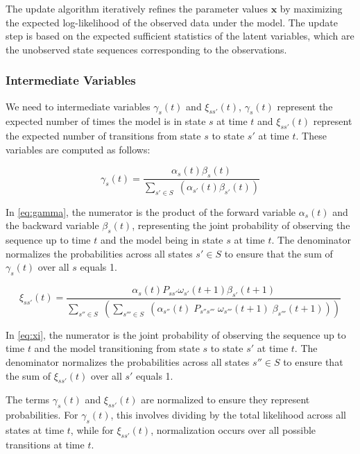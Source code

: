 The update algorithm iteratively refines the parameter values $\mathbf{x}$ by maximizing the expected log-likelihood of the observed data under the model.
The update step is based on the expected sufficient statistics of the latent variables, which are the unobserved state sequences corresponding to the observations.

\subsubsection{Intermediate Variables}
We need to intermediate variables $\gamma_s(t)$ and $\xi_{ss'}(t)$, $\gamma_s(t)$ represent the expected number of times the model is in state $s$ at time $t$ and $\xi_{ss'}(t)$ represent the expected number of transitions from state $s$ to state $s'$ at time $t$.
These variables are computed as follows:


\begin{equation}
    \gamma_s(t) = \frac{\alpha_s(t) \beta_s(t)}{\sum_{s' \in S} \;(\alpha_{s'}(t) \beta_{s'}(t))}
    \label{eq:gamma}
\end{equation}


In \autoref{eq:gamma}, the numerator is the product of the forward variable $\alpha_s(t)$ and the backward variable $\beta_s(t)$, representing the joint probability of observing the sequence up to time $t$ and the model being in state $s$ at time $t$.
The denominator normalizes the probabilities across all states $s' \in S$ to ensure that the sum of $\gamma_s(t)$ over all $s$ equals 1.


\begin{equation}
    \xi_{ss'}(t) = \frac{\alpha_s(t) P_{ss'} \omega_{s'}(t + 1) \beta_{s'}(t + 1)}{\sum_{s'' \in S} \;(\sum_{s''' \in S} \; (\alpha_{s''}(t) \; P_{s''s'''} \; \omega_{s'''}(t + 1) \; \beta_{s'''}(t + 1)))}
    \label{eq:xi}
\end{equation}


In \autoref{eq:xi}, the numerator is the joint probability of observing the sequence up to time $t$ and the model transitioning from state $s$ to state $s'$ at time $t$.
The denominator normalizes the probabilities across all states $s'' \in S$ to ensure that the sum of $\xi_{ss'}(t)$ over all $s'$ equals 1.

The terms $\gamma_s(t)$ and $\xi_{ss'}(t)$ are normalized to ensure they represent probabilities.
For $\gamma_s(t)$, this involves dividing by the total likelihood across all states at time $t$, while for $\xi_{ss'}(t)$, normalization occurs over all possible transitions at time $t$.

